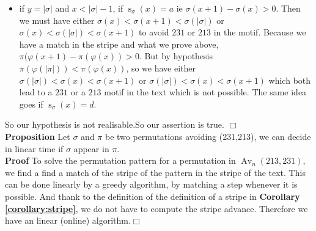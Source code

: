 \documentclass[a4paper]{llncs}
\DeclareMathOperator{\Avd}{Av}
\newcommand\Av[2]{\Avd_{{#1}}({#2})}
\newcommand{\ptext}{\pi}
\newcommand{\pmotif}{\sigma}
\DeclareMathOperator{\stripea}{s}
\newcommand{\stripe}[2]{\stripea_{{#1}}({#2})}
\newcounter{num}
\newcommand{\num}{\stepcounter{num} }
\newcommand{\dstep}{d}
\newcommand{\ustep}{a}
\begin{document}
\begin{itemize}
			\item if $y = |\pmotif|$ and $x<|\pmotif|-1$,
			if $\stripe{\pmotif}{x}=\ustep$ ie
			$\pmotif(x+1)-\pmotif(x)>0$. Then
			we must have either
			$\pmotif(x)<\pmotif(x+1)<\pmotif(|\pmotif|)$
			or $\pmotif(x)<\pmotif(|\pmotif|)<\pmotif(x+1)$ 
			to avoid $231$ or $213$ in the motif.
			Because we have a match in the stripe
			and what we prove above,
			$\ptext(\varphi(x+1)-\ptext(\varphi(x))>0$.
			But by hypothesis $\ptext(\varphi(|\ptext|))<\ptext(\varphi(x))$,
			so we have either 		
			$\pmotif(|\pmotif|)<\pmotif(x)<\pmotif(x+1)$
			or $\pmotif(|\pmotif|)<\pmotif(x)<\pmotif(x+1)$ 
			which both lead to a $231$ or a $213$ motif
			in the text which is not possible.
			The same idea goes if $\stripe{\pmotif}{x}=\dstep$. 			
			
		\end{itemize}
		So our hypothesis is not realisable.So our assertion is true. $\Box$\\
		
		\textbf{Proposition  \num \thenum} Let $\pmotif$ and $\ptext$
		be two permutations avoiding (231,213), 
		we can decide in linear time if $\pmotif$ 
		appear in $\ptext$.\\	
		
		\textbf{Proof}	
		To solve the permutation pattern for a permutation in $\Av{n}{213,231}$, 
		we find a find a match of the stripe of the pattern in the stripe of the text.
		This can be done linearly by a greedy algorithm, 
		by matching a step whenever it is possible.
		And thank to the definition of the definition of a stripe in \textbf{Corollary \ref{corollary:stripe}},
		we do not have to compute the stripe advance.
		Therefore we have an linear (online) algorithm.$\Box$\\
				

		
\end{document}
